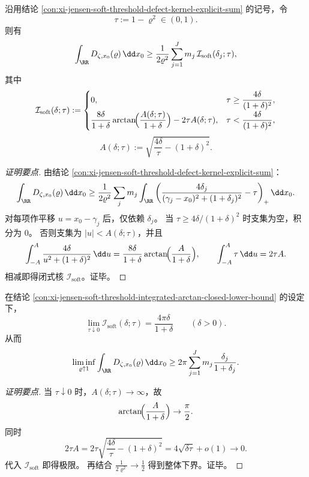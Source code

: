 \begin{conclusion}\label{con:xi-jensen-soft-threshold-integrated-arctan-closed-lower-bound}
沿用结论 \ref{con:xi-jensen-soft-threshold-defect-kernel-explicit-sum} 的记号，令
\[
\tau:=1-\varrho^2\in(0,1).
\]
则有
\[
\int_{\RR}D_{\zeta,x_0}(\varrho)\,\dd x_0
\ge
\frac1{2\varrho^2}\sum_{j=1}^{J}m_j\,\mathcal I_{\mathrm{soft}}(\delta_j;\tau),
\]
其中
\[
\mathcal I_{\mathrm{soft}}(\delta;\tau):=
\begin{cases}
0, & \tau\ge \dfrac{4\delta}{(1+\delta)^2},\\[2mm]
\dfrac{8\delta}{1+\delta}\arctan\!\Bigl(\dfrac{A(\delta;\tau)}{1+\delta}\Bigr)-2\tau A(\delta;\tau),
& \tau<\dfrac{4\delta}{(1+\delta)^2},
\end{cases}
\]
\[
A(\delta;\tau):=\sqrt{\frac{4\delta}{\tau}-(1+\delta)^2}.
\]
\end{conclusion}
\begin{proof}[证明要点]
由结论 \ref{con:xi-jensen-soft-threshold-defect-kernel-explicit-sum}：
\[
\int_{\RR}D_{\zeta,x_0}(\varrho)\,\dd x_0
\ge
\frac1{2\varrho^2}\sum_j m_j
\int_{\RR}\left(\frac{4\delta_j}{(\gamma_j-x_0)^2+(1+\delta_j)^2}-\tau\right)_+\dd x_0.
\]
对每项作平移 \(u=x_0-\gamma_j\) 后，仅依赖 \(\delta_j\)。
当 \(\tau\ge4\delta/(1+\delta)^2\) 时支集为空，积分为 \(0\)。
否则支集为 \(|u|<A(\delta;\tau)\)，并且
\[
\int_{-A}^{A}\frac{4\delta}{u^2+(1+\delta)^2}\,\dd u
=\frac{8\delta}{1+\delta}\arctan\!\Bigl(\frac{A}{1+\delta}\Bigr),\qquad
\int_{-A}^{A}\tau\,\dd u=2\tau A.
\]
相减即得闭式核 \(\mathcal I_{\mathrm{soft}}\)。证毕。
\end{proof}

\begin{conclusion}\label{con:xi-jensen-soft-threshold-integrated-limit-rigidity}
在结论 \ref{con:xi-jensen-soft-threshold-integrated-arctan-closed-lower-bound} 的设定下，
\[
\lim_{\tau\downarrow 0}\mathcal I_{\mathrm{soft}}(\delta;\tau)
=\frac{4\pi\delta}{1+\delta}\qquad(\delta>0).
\]
从而
\[
\liminf_{\varrho\uparrow 1}\int_{\RR}D_{\zeta,x_0}(\varrho)\,\dd x_0
\ge
2\pi\sum_{j=1}^{J}m_j\frac{\delta_j}{1+\delta_j}.
\]
\end{conclusion}
\begin{proof}[证明要点]
当 \(\tau\downarrow 0\) 时，\(A(\delta;\tau)\to\infty\)，故
\[
\arctan\!\Bigl(\frac{A}{1+\delta}\Bigr)\to\frac\pi2.
\]
同时
\[
2\tau A
=2\tau\sqrt{\frac{4\delta}{\tau}-(1+\delta)^2}
=4\sqrt{\delta\tau}+o(1)\to 0.
\]
代入 \(\mathcal I_{\mathrm{soft}}\) 即得极限。
再结合
\(
\frac1{2\varrho^2}\to\frac12
\)
得到整体下界。证毕。
\end{proof}

